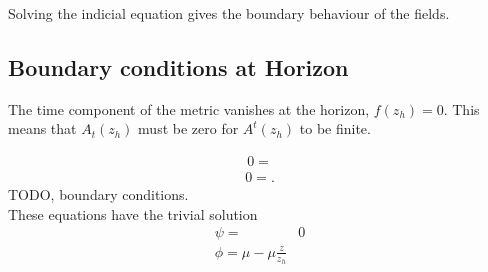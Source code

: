 \documentclass[12pt]{report}
\newcommand{\At}{\ensuremath{{\phi}}}
\begin{document}
Solving the indicial equation gives the boundary behaviour of the fields.
\subsection{Boundary conditions at Horizon}
The time component of the metric vanishes at the horizon, $f(z_h)=0$. This means that $A_t(z_h)$ must be zero for $A^t(z_h)$ to be finite.
 
\begin{eqnarray}
0=
\end{eqnarray}
\begin{eqnarray}
0=.
\end{eqnarray}
TODO, boundary conditions.\\
These equations have the trivial solution
\begin{equation}
 \begin{split}
  \psi=&0\\
  \At=\mu-\mu\frac{z}{z_h}\label{trivial}
 \end{split}
\end{equation}
\end{document}
